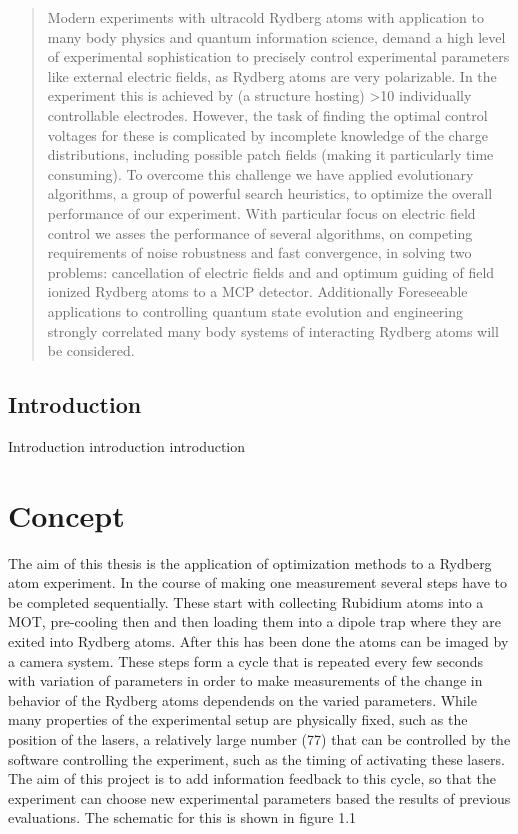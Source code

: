 \documentclass[a4paper,titlepage]{report}
\begin{document}
\begin{abstract}
Modern experiments with ultracold Rydberg atoms with application to many body physics and quantum information science, demand a  high level of experimental sophistication to precisely control experimental parameters like external electric fields, as Rydberg atoms are very  polarizable. In the experiment this is achieved by (a structure hosting) >10 individually controllable electrodes. However, the task of finding the optimal control voltages for these is complicated by incomplete knowledge of the charge distributions, including possible patch fields (making it particularly time consuming). To overcome this challenge we have applied evolutionary algorithms, a group of powerful search heuristics, to optimize the overall performance of our experiment. With particular focus on electric field control we asses the performance of several algorithms, on competing requirements of noise robustness and fast convergence, in solving two problems: cancellation of electric fields and and optimum guiding of field ionized Rydberg atoms to a MCP detector. Additionally Foreseeable applications to controlling quantum state evolution and engineering strongly correlated many body systems of interacting Rydberg atoms will be considered. 

\end{abstract}



\section*{Introduction}
Introduction introduction introduction

\tableofcontents

\chapter{Concept}

The aim of this thesis is the application of optimization methods to a Rydberg atom experiment. In the course of making one measurement several steps have to be completed sequentially. These start with collecting Rubidium atoms into a MOT, pre-cooling then and then loading them into a dipole trap where they are exited into Rydberg atoms. After this has been done the atoms can be imaged by a camera system. These steps form a cycle that is repeated every few seconds with variation of parameters in order to make measurements of the change in behavior of the Rydberg atoms dependends on the varied parameters. While many properties of the experimental setup are physically fixed, such as the position of the lasers, a relatively large number (77) that can be controlled by the software controlling the experiment, such as the timing of activating these lasers. The aim of this project is to add information feedback to this cycle, so that the experiment can choose new experimental parameters based the results of previous evaluations. The schematic for this is shown in figure 1.1
\end{document}
